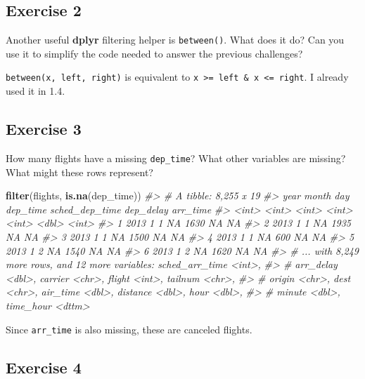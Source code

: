 \documentclass[]{book}
\newenvironment{Shaded}{\begin{snugshade}}{\end{snugshade}}
\newcommand{\CommentTok}[1]{\textcolor[rgb]{0.56,0.35,0.01}{\textit{#1}}}
\newcommand{\KeywordTok}[1]{\textcolor[rgb]{0.13,0.29,0.53}{\textbf{#1}}}
\newcommand{\NormalTok}[1]{#1}
\theoremstyle{definition}
\theoremstyle{definition}
\theoremstyle{definition}
\theoremstyle{remark}
\begin{document}
\hypertarget{exercise-2-1}{%
\subsection{Exercise 2}\label{exercise-2-1}}

Another useful \textbf{dplyr} filtering helper is \texttt{between()}.
What does it do? Can you use it to simplify the code needed to answer
the previous challenges?

\texttt{between(x,\ left,\ right)} is equivalent to
\texttt{x\ \textgreater{}=\ left\ \&\ x\ \textless{}=\ right}. I already
used it in 1.4.

\hypertarget{exercise-3-1}{%
\subsection{Exercise 3}\label{exercise-3-1}}

How many flights have a missing \texttt{dep\_time}? What other variables
are missing? What might these rows represent?

\begin{Shaded}
\begin{Highlighting}[]
\KeywordTok{filter}\NormalTok{(flights, }\KeywordTok{is.na}\NormalTok{(dep_time))}
\CommentTok{#> # A tibble: 8,255 x 19}
\CommentTok{#>    year month   day dep_time sched_dep_time dep_delay arr_time}
\CommentTok{#>   <int> <int> <int>    <int>          <int>     <dbl>    <int>}
\CommentTok{#> 1  2013     1     1       NA           1630        NA       NA}
\CommentTok{#> 2  2013     1     1       NA           1935        NA       NA}
\CommentTok{#> 3  2013     1     1       NA           1500        NA       NA}
\CommentTok{#> 4  2013     1     1       NA            600        NA       NA}
\CommentTok{#> 5  2013     1     2       NA           1540        NA       NA}
\CommentTok{#> 6  2013     1     2       NA           1620        NA       NA}
\CommentTok{#> # ... with 8,249 more rows, and 12 more variables: sched_arr_time <int>,}
\CommentTok{#> #   arr_delay <dbl>, carrier <chr>, flight <int>, tailnum <chr>,}
\CommentTok{#> #   origin <chr>, dest <chr>, air_time <dbl>, distance <dbl>, hour <dbl>,}
\CommentTok{#> #   minute <dbl>, time_hour <dttm>}
\end{Highlighting}
\end{Shaded}

Since \texttt{arr\_time} is also missing, these are canceled flights.

\hypertarget{exercise-4}{%
\subsection{Exercise 4}\label{exercise-4}}
\end{document}

